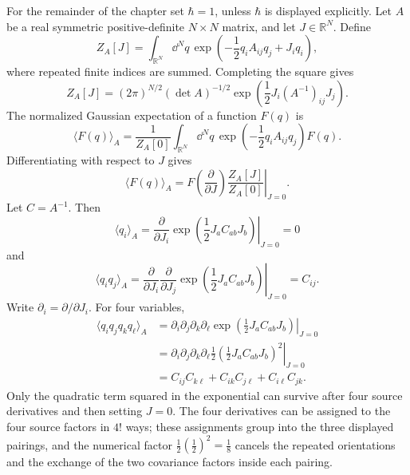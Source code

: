 For the remainder of the chapter set \(\hbar=1\), unless \(\hbar\) is
displayed explicitly. Let \(A\) be a real symmetric positive-definite \(N\times N\)
matrix, and let \(J\in\mathbb R^N\). Define
\[
  Z_A[J]
  =
  \int_{\mathbb R^N}\dd^Nq\,
  \exp\left(
    -\frac12q_iA_{ij}q_j+J_iq_i
  \right),
\]
where repeated finite indices are summed. Completing the square gives
\[
  Z_A[J]
  =
  (2\pi)^{N/2}(\det A)^{-1/2}
  \exp\left(
    \frac12J_i(A^{-1})_{ij}J_j
  \right).
\]
The normalized Gaussian expectation of a function \(F(q)\) is
\[
  \langle F(q)\rangle_A
  =
  \frac{1}{Z_A[0]}
  \int_{\mathbb R^N}\dd^Nq\,
  \exp\left(-\frac12q_iA_{ij}q_j\right)F(q).
\]
Differentiating with respect to \(J\) gives
\[
  \langle F(q)\rangle_A
  =
  \left.
  F\left(\frac{\partial}{\partial J}\right)
  \frac{Z_A[J]}{Z_A[0]}
  \right|_{J=0}.
\]
Let \(C=A^{-1}\).  Then
\[
  \langle q_i\rangle_A
  =
  \left.
  \frac{\partial}{\partial J_i}
  \exp\left(\frac12J_aC_{ab}J_b\right)
  \right|_{J=0}
  =
  0
\]
and
\[
  \langle q_iq_j\rangle_A
  =
  \left.
  \frac{\partial}{\partial J_i}
  \frac{\partial}{\partial J_j}
  \exp\left(\frac12J_aC_{ab}J_b\right)
  \right|_{J=0}
  =
  C_{ij}.
\]
Write \(\partial_i=\partial/\partial J_i\).  For four variables,
\[
\begin{aligned}
  \langle q_iq_jq_kq_\ell\rangle_A
  &=
  \left.
  \partial_i\partial_j\partial_k\partial_\ell
  \exp\left(\frac12J_aC_{ab}J_b\right)
  \right|_{J=0}  \\
  &=
  \left.
  \partial_i\partial_j\partial_k\partial_\ell
  \frac12\left(\frac12J_aC_{ab}J_b\right)^2
  \right|_{J=0}  \\
  &=
  C_{ij}C_{k\ell}+C_{ik}C_{j\ell}+C_{i\ell}C_{jk}.
\end{aligned}
\]
Only the quadratic term squared in the exponential can survive after four
source derivatives and then setting \(J=0\).  The four derivatives can be
assigned to the four source factors in \(4!\) ways; these assignments group
into the three displayed pairings, and the numerical factor
\(\frac12(\frac12)^2=\frac18\) cancels the repeated orientations and the
exchange of the two covariance factors inside each pairing.

